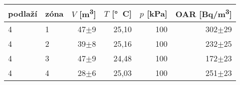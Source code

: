 \begin{tabular}{llrrrr}
\toprule
podlaží& zóna & $V$ [\si{m^3}] & $T$ [\si{\degree C}]& $p$ [\si{kPa}] & OAR [\si{Bq/m^3}] \\
\midrule                                    
4 &  1  &     47$\pm$9       & 25,10& 100& 302$\pm$29 \\  
4 &  2  &     39$\pm$8       & 25,16& 100& 232$\pm$25 \\ 
4 &  3  &     47$\pm$9       & 24,48& 100& 172$\pm$23 \\
4 &  4  &     28$\pm$6       & 25,03& 100& 251$\pm$23 \\
\bottomrule
\end{tabular}








